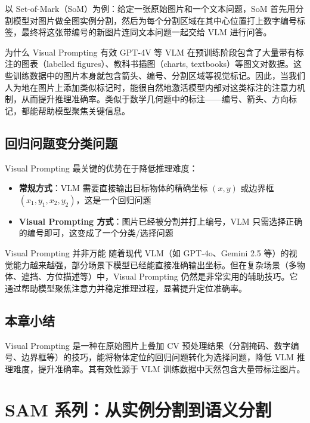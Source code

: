 \documentclass[a4paper]{article}
\begin{document}
以 Set-of-Mark（SoM）为例：给定一张原始图片和一个文本问题，SoM 首先用分割模型对图片做全图实例分割，然后为每个分割区域在其中心位置打上数字编号标签，最终将这张带编号的新图片连同文本问题一起交给 VLM 进行问答。

\begin{knowledgebox}{为什么 Visual Prompting 有效}
GPT-4V 等 VLM 在预训练阶段包含了大量带有标注的图表（labelled figures）、教科书插图（charts, textbooks）等图文对数据。这些训练数据中的图片本身就包含箭头、编号、分割区域等视觉标记。因此，当我们人为地在图片上添加类似标记时，能很自然地激活模型内部对这类标注的注意力机制，从而提升推理准确率。类似于数学几何题中的标注——编号、箭头、方向标记，都能帮助模型聚焦关键信息。
\end{knowledgebox}

\subsection{回归问题变分类问题}

Visual Prompting 最关键的优势在于降低推理难度：

\begin{itemize}
    \item \textbf{常规方式}：VLM 需要直接输出目标物体的精确坐标 $(x, y)$ 或边界框 $(x_1, y_1, x_2, y_2)$，这是一个回归问题
    \item \textbf{Visual Prompting 方式}：图片已经被分割并打上编号，VLM 只需选择正确的编号即可，这变成了一个分类/选择问题
\end{itemize}

\begin{warningbox}{Visual Prompting 并非万能}
随着现代 VLM（如 GPT-4o、Gemini 2.5 等）的视觉能力越来越强，部分场景下模型已经能直接准确输出坐标。但在复杂场景（多物体、遮挡、方位描述等）中，Visual Prompting 仍然是非常实用的辅助技巧。它通过帮助模型聚焦注意力并稳定推理过程，显著提升定位准确率。
\end{warningbox}

\subsection{本章小结}

Visual Prompting 是一种在原始图片上叠加 CV 预处理结果（分割掩码、数字编号、边界框等）的技巧，能将物体定位的回归问题转化为选择问题，降低 VLM 推理难度，提升准确率。其有效性源于 VLM 训练数据中天然包含大量带标注图片。


\section{SAM 系列：从实例分割到语义分割}
\end{document}
